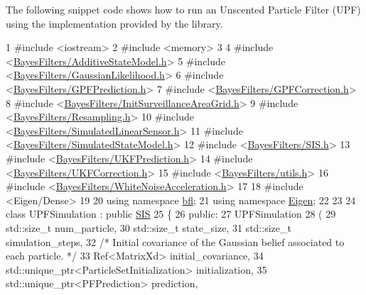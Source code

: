 The following snippet code shows how to run an Unscented Particle Filter (U\+PF) using the implementation provided by the library.~\newline



\begin{DoxyCodeInclude}
1 \textcolor{preprocessor}{#include <iostream>}
2 \textcolor{preprocessor}{#include <memory>}
3 
4 \textcolor{preprocessor}{#include <\mbox{\hyperlink{AdditiveStateModel_8h}{BayesFilters/AdditiveStateModel.h}}>}
5 \textcolor{preprocessor}{#include <\mbox{\hyperlink{GaussianLikelihood_8h}{BayesFilters/GaussianLikelihood.h}}>}
6 \textcolor{preprocessor}{#include <\mbox{\hyperlink{GPFPrediction_8h}{BayesFilters/GPFPrediction.h}}>}
7 \textcolor{preprocessor}{#include <\mbox{\hyperlink{GPFCorrection_8h}{BayesFilters/GPFCorrection.h}}>}
8 \textcolor{preprocessor}{#include <\mbox{\hyperlink{InitSurveillanceAreaGrid_8h}{BayesFilters/InitSurveillanceAreaGrid.h}}>}
9 \textcolor{preprocessor}{#include <\mbox{\hyperlink{Resampling_8h}{BayesFilters/Resampling.h}}>}
10 \textcolor{preprocessor}{#include <\mbox{\hyperlink{SimulatedLinearSensor_8h}{BayesFilters/SimulatedLinearSensor.h}}>}
11 \textcolor{preprocessor}{#include <\mbox{\hyperlink{SimulatedStateModel_8h}{BayesFilters/SimulatedStateModel.h}}>}
12 \textcolor{preprocessor}{#include <\mbox{\hyperlink{SIS_8h}{BayesFilters/SIS.h}}>}
13 \textcolor{preprocessor}{#include <\mbox{\hyperlink{UKFPrediction_8h}{BayesFilters/UKFPrediction.h}}>}
14 \textcolor{preprocessor}{#include <\mbox{\hyperlink{UKFCorrection_8h}{BayesFilters/UKFCorrection.h}}>}
15 \textcolor{preprocessor}{#include <\mbox{\hyperlink{utils_8h}{BayesFilters/utils.h}}>}
16 \textcolor{preprocessor}{#include <\mbox{\hyperlink{WhiteNoiseAcceleration_8h}{BayesFilters/WhiteNoiseAcceleration.h}}>}
17 
18 \textcolor{preprocessor}{#include <Eigen/Dense>}
19 
20 \textcolor{keyword}{using namespace }\mbox{\hyperlink{namespacebfl}{bfl}};
21 \textcolor{keyword}{using namespace }\mbox{\hyperlink{namespaceEigen}{Eigen}};
22 
23 
24 \textcolor{keyword}{class }UPFSimulation : \textcolor{keyword}{public} \mbox{\hyperlink{classbfl_1_1SIS}{SIS}}
25 \{
26 \textcolor{keyword}{public}:
27     UPFSimulation
28     (
29         std::size\_t num\_particle,
30         std::size\_t state\_size,
31         std::size\_t simulation\_steps,
32         \textcolor{comment}{/* Initial covariance of the Gaussian belief associated to each particle. */}
33         Ref<MatrixXd> initial\_covariance,
34         std::unique\_ptr<ParticleSetInitialization> initialization,
35         std::unique\_ptr<PFPrediction> prediction,

\end{DoxyCodeInclude}
